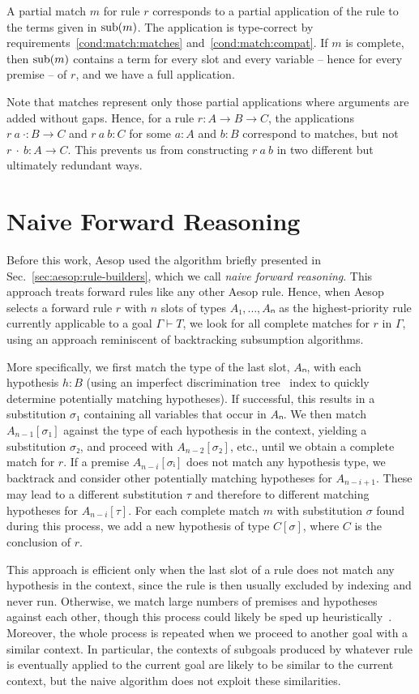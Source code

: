 A partial match $m$ for rule $r$ corresponds to a partial application of the rule to the terms given in ${\operatorname{sub}}(m)$.
The application is type-correct by requirements~\ref{cond:match:matches} and~\ref{cond:match:compat}.
If $m$ is complete, then ${\operatorname{sub}}(m)$ contains a term for every slot and every variable -- hence for every premise -- of $r$, and we have a full application.

Note that matches represent only those partial applications where arguments are added without gaps.
Hence, for a rule $r : A → B → C$, the applications $r~a~· : B \to C$ and $r~a~b : C$ for some $a : A$ and $b : B$ correspond to matches, but not $r~·~b : A \to C$.
This prevents us from constructing $r~a~b$ in two different but ultimately redundant ways.

\section{Naive Forward Reasoning}%
\label{sec:forward:naive}

Before this work, Aesop used the algorithm briefly presented in Sec.~\ref{sec:aesop:rule-builders}, which we call \emph{naive forward reasoning}.
This approach treats forward rules like any other Aesop rule.
Hence, when Aesop selects a forward rule $r$ with $n$ slots of types $A₁, \dots, Aₙ$ as the highest-priority rule currently applicable to a goal $Γ ⊢ T$, we look for all complete matches for $r$ in $Γ$, using an approach reminiscent of backtracking subsumption algorithms.

More specifically, we first match the type of the last slot, $Aₙ$, with each hypothesis $h : B$ (using an imperfect discrimination tree~\cite{DiscriminationTrees} index to quickly determine potentially matching hypotheses).
If successful, this results in a substitution $σ₁$ containing all variables that occur in $Aₙ$.
We then match $A_{n-1}[σ₁]$ against the type of each hypothesis in the context, yielding a substitution $σ₂$, and proceed with $A_{n-2}[σ₂]$, etc., until we obtain a complete match for $r$.
If a premise $A_{n-i}[σᵢ]$ does not match any hypothesis type, we backtrack and consider other potentially matching hypotheses for $A_{n-i+1}$.
These may lead to a different substitution $τ$ and therefore to different matching hypotheses for $A_{n-i}[τ]$.
For each complete match $m$ with substitution $σ$ found during this process, we add a new hypothesis of type $C[σ]$, where $C$ is the conclusion of $r$.

This approach is efficient only when the last slot of a rule does not match any hypothesis in the context, since the rule is then usually excluded by indexing and never run.
Otherwise, we match large numbers of premises and hypotheses against each other, though this process could likely be sped up heuristically~\cite{TammetSubsumption}.
Moreover, the whole process is repeated when we proceed to another goal with a similar context.
In particular, the contexts of subgoals produced by whatever rule is eventually applied to the current goal are likely to be similar to the current context, but the naive algorithm does not exploit these similarities.

